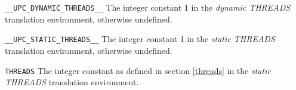 \begin{description}
\item{\tt \_\_UPC\_DYNAMIC\_THREADS\_\_} 
The integer constant 1 in the {\em dynamic THREADS} translation environment,
otherwise undefined.

\item{\tt \_\_UPC\_STATIC\_THREADS\_\_} 
The integer constant 1 in the {\em static THREADS} translation environment,
otherwise undefined.

\item{\tt THREADS}
The integer constant as defined in section \ref{threads} in the
{\em static THREADS} translation environment.

\end{description}

